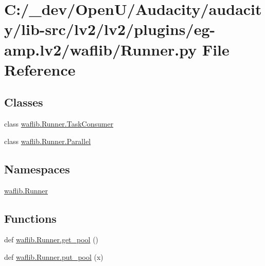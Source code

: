 \hypertarget{lv2_2plugins_2eg-amp_8lv2_2waflib_2_runner_8py}{}\section{C\+:/\+\_\+dev/\+Open\+U/\+Audacity/audacity/lib-\/src/lv2/lv2/plugins/eg-\/amp.lv2/waflib/\+Runner.py File Reference}
\label{lv2_2plugins_2eg-amp_8lv2_2waflib_2_runner_8py}
\subsection*{Classes}
\begin{DoxyCompactItemize}
\item 
class \hyperlink{classwaflib_1_1_runner_1_1_task_consumer}{waflib.\+Runner.\+Task\+Consumer}
\item 
class \hyperlink{classwaflib_1_1_runner_1_1_parallel}{waflib.\+Runner.\+Parallel}
\end{DoxyCompactItemize}
\subsection*{Namespaces}
\begin{DoxyCompactItemize}
\item 
 \hyperlink{namespacewaflib_1_1_runner}{waflib.\+Runner}
\end{DoxyCompactItemize}
\subsection*{Functions}
\begin{DoxyCompactItemize}
\item 
def \hyperlink{namespacewaflib_1_1_runner_a30bf6bcb906d0ab627890f2174b1e463}{waflib.\+Runner.\+get\+\_\+pool} ()
\item 
def \hyperlink{namespacewaflib_1_1_runner_a1e26175912d7655d9c38a50d71caeb6f}{waflib.\+Runner.\+put\+\_\+pool} (x)
\end{DoxyCompactItemize}
